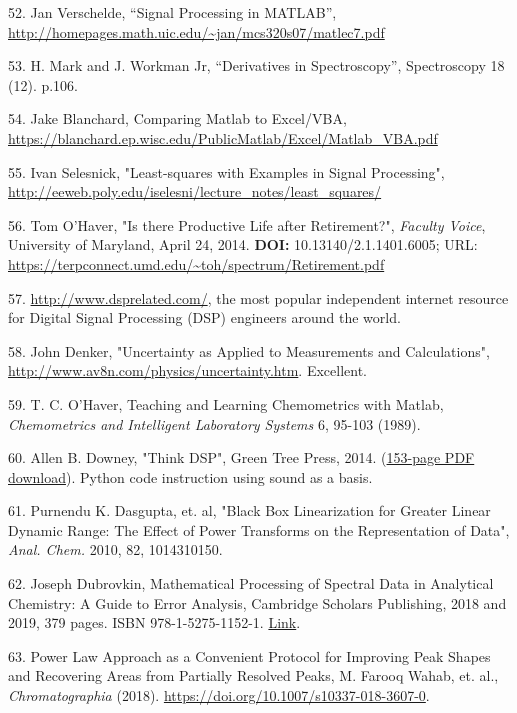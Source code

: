 52. Jan Verschelde, ``Signal Processing in MATLAB'', \url{http://homepages.math.uic.edu/~jan/mcs320s07/matlec7.pdf} 

53. H. Mark and J. Workman Jr, ``Derivatives in Spectroscopy'', Spectroscopy 18 (12). p.106.

54. Jake Blanchard, Comparing Matlab to Excel/VBA, \url{https://blanchard.ep.wisc.edu/PublicMatlab/Excel/Matlab_VBA.pdf}

55. Ivan Selesnick, "Least-squares with Examples in Signal Processing", \url{http://eeweb.poly.edu/iselesni/lecture_notes/least_squares/}

56. Tom O'Haver, "Is there Productive Life after Retirement?", \textit{Faculty Voice}, University of Maryland, April 24, 2014. \textbf{DOI:} 10.13140/2.1.1401.6005; URL: \href{http://imerrill.umd.edu/facultyvoice1/?p=3231}{https://terpconnect.umd.edu/\textasciitilde{}toh/spectrum/Retirement.pdf}

57. \url{http://www.dsprelated.com/}, the most popular independent internet resource for Digital Signal Processing (DSP) engineers around the world. 

58. John Denker, "Uncertainty as Applied to Measurements and Calculations", \url{http://www.av8n.com/physics/uncertainty.htm}\textcolor{color-8}{.} Excellent\textcolor{color-8}{.}

59. T. C. O'Haver, Teaching and Learning Chemometrics with Matlab, \textit{Chemometrics and Intelligent Laboratory Systems} 6, 95-103 (1989).

60. Allen B. Downey, "Think DSP", Green Tree Press, 2014. (\href{http://greenteapress.com/thinkdsp/thinkdsp.pdf}{153-page PDF download}). Python code instruction using sound as a basis.

61. Purnendu K. Dasgupta, et. al, "Black Box Linearization for Greater Linear Dynamic Range: The Effect of Power Transforms on the Representation of Data", \textit{Anal. Chem.} 2010, 82, 10143\textendash{}10150.

62. Joseph Dubrovkin, Mathematical Processing of Spectral Data in Analytical Chemistry: A Guide to Error Analysis, Cambridge Scholars Publishing, 2018 and 2019, 379 pages. ISBN 978-1-5275-1152-1. \href{http://www.cambridgescholars.com/mathematical-processing-of-spectral-data-in-analytical-chemistry}{Link}.

63. Power Law Approach as a Convenient Protocol for Improving Peak Shapes and Recovering Areas from Partially Resolved Peaks, M. Farooq Wahab, et. al., \textit{Chromatographia} (2018). \url{https://doi.org/10.1007/s10337-018-3607-0}. 

